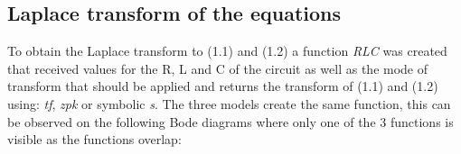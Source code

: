 \documentclass[a4paper,12pt]{article}
\begin{document}
\vspace{0.5cm}

\subsection{Laplace transform of the equations}

\vspace{0.5cm}

To obtain the Laplace transform to (1.1) and (1.2) a function \textit{RLC} was created that received values for the R, L and C of the circuit as well as the mode of transform that should be applied and returns the transform of (1.1) and (1.2) using: \textit{tf}, \textit{zpk} or symbolic \textit{s}. The three models create the same function, this can be observed on the following Bode diagrams where only one of the 3 functions is visible as the functions overlap:

\vspace{0.5cm}
\end{document}
